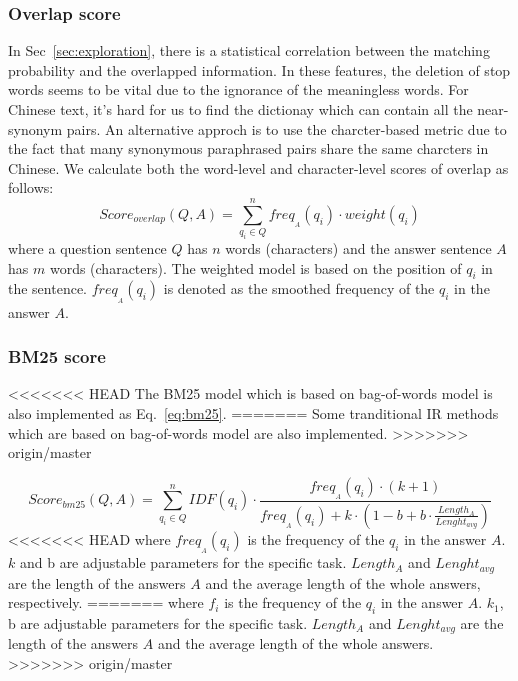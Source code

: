 \documentclass{llncs}
\begin{document}
\begin{table}[!htbp]
\begin{table}[!htbp]
\subsubsection{Overlap score}
In Sec~\ref{sec:exploration}, there is a statistical correlation between the matching probability and the overlapped information. 
In these features, the deletion of stop words seems to be vital due to the ignorance of the meaningless words. For Chinese text, it's hard for us to find the dictionay which can contain all the near-synonym pairs. An alternative approch is to use the charcter-based metric due to the fact that many synonymous paraphrased pairs share the same charcters in Chinese. We calculate both the word-level and character-level scores of overlap as follows:
\begin{equation}
Score_{overlap}(Q,A)=\sum_{q_i \in Q}^n freq_{_A}(q_i)\cdot weight(q_i)  
\label{eq:overlap}
\end{equation}
where a question sentence $Q$ has $n$ words (characters) and the answer sentence $A$ has $m$ words (characters). The weighted model is based on the position of $q_i$ in the sentence. %
$freq_{_A}(q_i)$ is denoted as the smoothed frequency of the $q_i$ in the answer $A$.


\subsubsection{BM25 score}
<<<<<<< HEAD
The BM25 model which is based on bag-of-words model is also implemented as Eq.~\ref{eq:bm25}.
=======
Some tranditional IR methods which are based on bag-of-words model are also implemented.
>>>>>>> origin/master

\begin{equation}
Score_{bm25}(Q,A)=\sum_{q_i \in Q}^nIDF(q_i)\cdot \frac{freq_{_A}(q_i)\cdot(k+1)}{freq_{_A}(q_i) + k \cdot (1-b +b\cdot \frac{Length_A}{Lenght_{avg}})}  
\label{eq:bm25}
\end{equation}
<<<<<<< HEAD
where $freq_{_A}(q_i)$ is the frequency of the $q_i$ in the answer $A$. $k$ and b are adjustable parameters for the specific task. $Length_A$ and $Lenght_{avg}$ are the length of the answers $A$ and the average length of the whole answers, respectively.
=======
where $f_i$ is the frequency of the $q_i$ in the answer $A$. $k_1$, b are adjustable parameters for the specific task. $Length_A$ and $Lenght_{avg}$ are the length of the answers $A$ and the average length of the whole answers.
>>>>>>> origin/master


\end{table}
\end{table}
\end{document}
